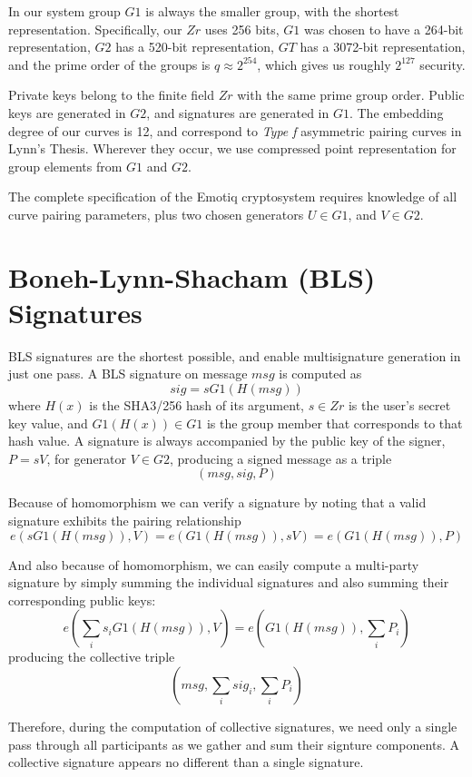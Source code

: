 \documentclass[article,oneside]{memoir}
\begin{document}
In our system group $G1$ is always the smaller group, with the shortest representation. Specifically, our $Zr$ uses 256 bits, $G1$ was chosen to have a 264-bit representation, $G2$ has a 520-bit representation, $GT$ has a 3072-bit representation, and the prime order of the groups is $q \approx  2^{254}$, which gives us roughly $2^{127}$ security.

Private keys belong to the finite field $Zr$ with the same prime group order. Public keys are generated in $G2$, and signatures are generated in $G1$. The embedding degree of our curves is 12, and correspond to {\emph{Type f}} asymmetric pairing curves in Lynn's Thesis\cite{thesis}. Wherever they occur, we use  compressed point representation for group elements from $G1$ and $G2$.

The complete specification of the Emotiq cryptosystem requires knowledge of all curve pairing parameters, plus two chosen generators $U \in G1$, and $V \in G2$.

\chapter{Boneh-Lynn-Shacham (BLS) Signatures}

BLS signatures are the shortest possible, and enable multisignature generation in just one pass. A BLS signature on message $msg$ is computed as $$sig = s G1(H(msg))$$ where $H(x)$ is the SHA3/256 hash of its argument, $s \in Zr$ is the user's secret key value, and $G1(H(x)) \in G1$ is the group member that corresponds to that hash value. A signature is always accompanied by the public key of the signer, $P = s V$, for generator $V \in G2$,  producing a signed message as a triple $$(msg, sig, P)$$

Because of homomorphism we can verify a signature by noting that a valid signature exhibits the pairing relationship $$e(s  G1(H(msg)),V) = e(G1(H(msg)), s V) = e(G1(H(msg)), P)$$

And also because of homomorphism, we can easily compute a multi-party signature by simply summing the individual signatures and also summing their corresponding public keys: $$e({\sum_i s_i} G1(H(msg)),V) = e(G1(H(msg)), {\sum_i P_i})$$ producing the collective triple $$(msg, {\sum_i sig_i}, {\sum_i P_i})$$

Therefore, during the computation of collective signatures, we need only a single pass through all participants as we gather and sum their signture components. A collective signature appears no different than a single signature.
\end{document}
